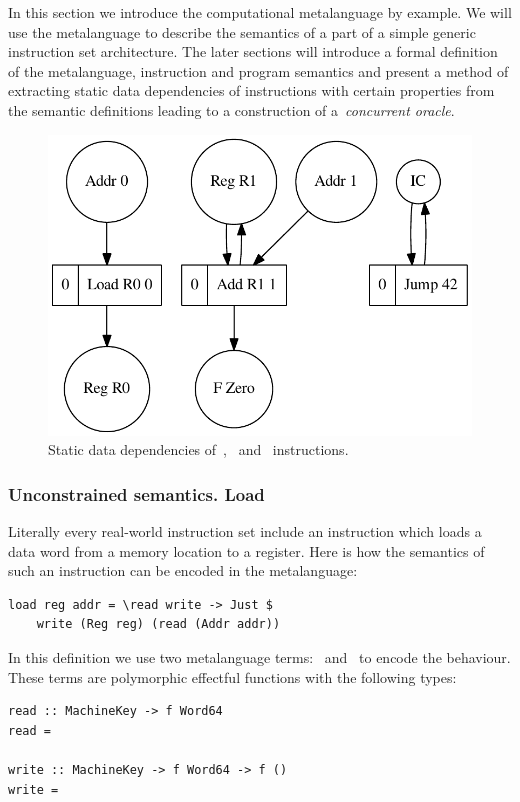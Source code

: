 In this section we introduce the computational metalanguage by example. We will
use the metalanguage to describe the semantics of a part of a simple generic instruction
set architecture. The later sections will introduce a formal definition of the
metalanguage, instruction and program semantics and present a method of extracting static
data dependencies of instructions with certain properties from the semantic definitions
leading to a construction of a~\emph{concurrent oracle}.

\begin{figure}[H]
\includegraphics[width=35em]{img/loadJumpAdd.pdf}
\caption{Static data dependencies of~,~ and~ instructions.}
\end{figure}

\subsubsection{Unconstrained semantics. Load} Literally every real-world instruction set include an instruction
which loads a data word from a memory location to a register. Here is how the
semantics of such an instruction can be encoded in the metalanguage:

\begin{verbatim}
load reg addr = \read write -> Just $
    write (Reg reg) (read (Addr addr))
\end{verbatim}

In this definition we use two metalanguage terms:~ and~ to encode
the behaviour. These terms are polymorphic effectful functions with the following
types:

\begin{verbatim}
read :: MachineKey -> f Word64
read =

write :: MachineKey -> f Word64 -> f ()
write =
\end{verbatim}

